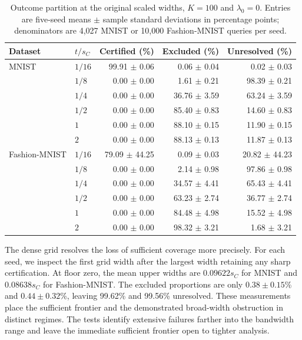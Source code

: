 \begin{table}[!htbp]
\centering\small
\caption{Outcome partition at the original scaled widths, $K=100$ and $\lambda_0=0$. Entries are five-seed means $\pm$ sample standard deviations in percentage points; denominators are 4,027 MNIST or 10,000 Fashion-MNIST queries per seed.}
\label{tab:region-diagnosis}
\begin{tabular}{llrrr}
\toprule
Dataset & $t/s_C$ & Certified (\%) & Excluded (\%) & Unresolved (\%)\\
\midrule
MNIST & $1/16$ & 99.91 $\pm$ 0.06 & 0.06 $\pm$ 0.04 & 0.02 $\pm$ 0.03 \\
 & $1/8$ & 0.00 $\pm$ 0.00 & 1.61 $\pm$ 0.21 & 98.39 $\pm$ 0.21 \\
 & $1/4$ & 0.00 $\pm$ 0.00 & 36.76 $\pm$ 3.59 & 63.24 $\pm$ 3.59 \\
 & $1/2$ & 0.00 $\pm$ 0.00 & 85.40 $\pm$ 0.83 & 14.60 $\pm$ 0.83 \\
 & $1$ & 0.00 $\pm$ 0.00 & 88.10 $\pm$ 0.15 & 11.90 $\pm$ 0.15 \\
 & $2$ & 0.00 $\pm$ 0.00 & 88.13 $\pm$ 0.13 & 11.87 $\pm$ 0.13 \\
\midrule
Fashion-MNIST & $1/16$ & 79.09 $\pm$ 44.25 & 0.09 $\pm$ 0.03 & 20.82 $\pm$ 44.23 \\
 & $1/8$ & 0.00 $\pm$ 0.00 & 2.14 $\pm$ 0.98 & 97.86 $\pm$ 0.98 \\
 & $1/4$ & 0.00 $\pm$ 0.00 & 34.57 $\pm$ 4.41 & 65.43 $\pm$ 4.41 \\
 & $1/2$ & 0.00 $\pm$ 0.00 & 63.23 $\pm$ 2.74 & 36.77 $\pm$ 2.74 \\
 & $1$ & 0.00 $\pm$ 0.00 & 84.48 $\pm$ 4.98 & 15.52 $\pm$ 4.98 \\
 & $2$ & 0.00 $\pm$ 0.00 & 98.32 $\pm$ 3.21 & 1.68 $\pm$ 3.21 \\
\bottomrule
\end{tabular}
\end{table}

The dense grid resolves the loss of sufficient coverage more precisely. For each seed, we inspect the first grid width after the largest width retaining any sharp certification. At floor zero, the mean upper widths are $0.09622s_C$ for MNIST and $0.08638s_C$ for Fashion-MNIST. The excluded proportions are only $0.38\pm0.15$\% and $0.44\pm0.32$\%, leaving 99.62\% and 99.56\% unresolved. These measurements place the sufficient frontier and the demonstrated broad-width obstruction in distinct regimes. The tests identify extensive failures farther into the bandwidth range and leave the immediate sufficient frontier open to tighter analysis.

